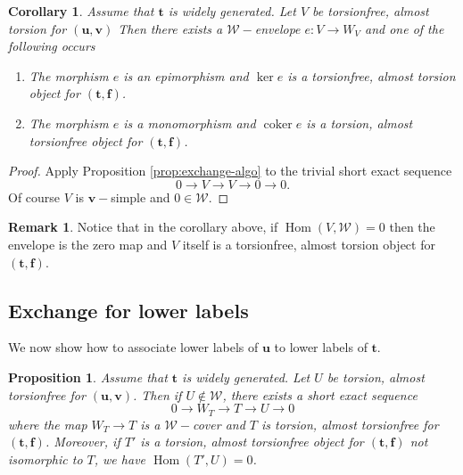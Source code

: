 \documentclass[11pt]{amsart}
\newtheorem{proposition}[theorem]{Proposition}
\newtheorem{corollary}[theorem]{Corollary}
\theoremstyle{definition}
\newtheorem{remark}[theorem]{Remark}
\newcommand{\coker}{\operatorname{coker}}
\newcommand{\Hom}{\operatorname{Hom}}
\newcommand{\tpair}[2]{(\mathbf{#1}, \mathbf{#2})  }
\begin{document}
\begin{corollary}
\label{cor:up-exchange}
Assume that \(\mathbf t\) is widely generated. Let \(V\)  be torsionfree, almost torsion for \(\tpair{u}{v}\)
Then there exists a \( \mathcal{W}-\)envelope \( e : V \to W_V \) and one of the following occurs
\begin{enumerate}
\item The morphism \(e \) is an epimorphism and \(\ker e \) is a torsionfree, almost torsion object for \( \tpair{t}{f} \).
\item The morphism \(e \) is a monomorphism and \( \coker e \) is a torsion, almost torsionfree object for \( \tpair{t}{f} \).
\end{enumerate}
\end{corollary}

\begin{proof}
Apply Proposition \ref{prop:exchange-algo} to the trivial short exact sequence \[ 0 \to V \to V \to 0 \to 0. \] Of course \( V \) is \( \mathbf{v}-\)simple and \( 0 \in \mathcal{W} \).
\end{proof}

\begin{remark}
Notice that in the corollary above, if \( \Hom(V, \mathcal{W}) = 0 \) then the envelope is the zero map and \( V \) itself is a torsionfree, almost torsion object for \( \tpair{t}{f} \).
\end{remark}

\subsection{Exchange for lower labels}

We now show how to associate lower labels of \( \mathbf{u} \) to lower labels of \( \mathbf{t} \).



\begin{proposition}
\label{prop:lower-exchange}
Assume that \(\mathbf t\) is widely generated. Let \(U\)  be torsion, almost torsionfree for \(\tpair{u}{v}\). Then if \( U \not \in \mathcal{W} \), there exists a short exact sequence
\[
0 \to W_T \to T \to U \to 0 
\]
where the map \( W_T \to T \) is a \( \mathcal{W}-\)cover and \( T \) is torsion, almost torsionfree for \( \tpair{t}{f} \). Moreover, if \( T' \) is a torsion, almost torsionfree object for \( \tpair{t}{f} \) not isomorphic to \( T \), we have \( \Hom(T', U) = 0 \).
\end{proposition}
\end{document}
